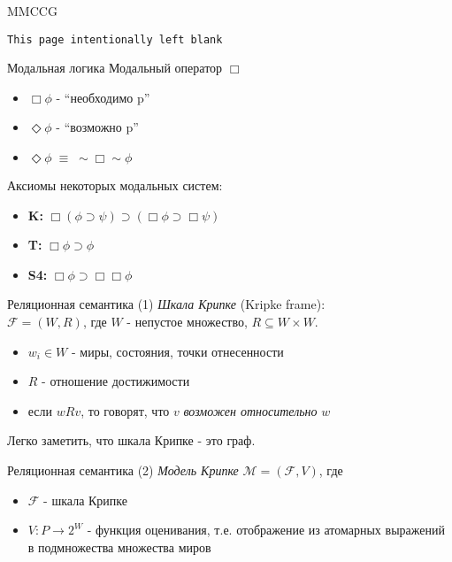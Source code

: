 \documentclass{beamer}
\begin{document}
\begin{frame}{MMCCG}
\begin{center}
\texttt{This page intentionally left blank}
\end{center}
\end{frame}

\begin{frame}{Модальная логика}
Модальный оператор $\Box$\\
\bigskip
\begin{itemize}
	\item $\Box \phi$ - ``необходимо p''
	\item $\Diamond \phi$ - ``возможно p''
	\item $\Diamond \phi \; \equiv \; \sim \Box \sim \phi$
\end{itemize}
\bigskip
Аксиомы некоторых модальных систем:
\begin{itemize}
  \item \textbf{K: } $\Box (\phi \supset \psi) \supset ( \Box \phi \supset \Box \psi)$
  \item \textbf{T: } $\Box \phi \supset \phi$
  \item \textbf{S4:} $\Box \phi \supset \Box \Box \phi$
\end{itemize}
\bigskip
\end{frame}

\begin{frame}{Реляционная семантика (1)}
\textit{Шкала Крипке} (Kripke frame):\\
\bigskip
$\mathcal{F} = (W, R)$, где $W$ - непустое множество, $R \subseteq W \times W$.\\
\bigskip
\begin{itemize}
  \item $w_i \in W$ - миры, состояния, точки отнесенности
  \item $R$ - отношение достижимости
  \item если $wRv$, то говорят, что $v$ \textit{возможен относительно} $w$
\end{itemize}
\bigskip
Легко заметить, что шкала Крипке - это граф.
\end{frame}

\begin{frame}{Реляционная семантика (2)}
\textit{Модель Крипке} $\mathcal{M} = (\mathcal{F}, V)$, где  
\bigskip
\begin{itemize}
  \item $\mathcal{F}$ - шкала Крипке
  \item $V : P \to 2^W$ - функция оценивания, т.е. отображение из атомарных выражений в подмножества множества миров
\end{itemize}
\bigskip
\end{frame}
\end{document}
